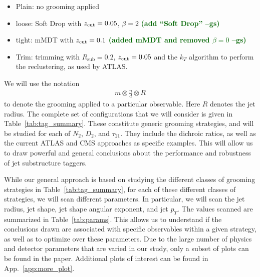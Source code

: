 \documentclass[11pt,letterpaper]{article}
\DeclareRobustCommand{\App}[1]{App.~\ref{#1}}
\DeclareRobustCommand{\Tab}[1]{Table~\ref{#1}}
\newcommand{\zcut}{z_{\rm cut}}
\newcommand{\gs}[1]{\textbf{\textcolor{darkgreen}{(#1 --gs)}}}
\begin{document}
\begin{itemize}
\item Plain: no grooming applied
\item loose: Soft Drop with $\zcut=0.05$, $\beta=2$ \gs{add ``Soft Drop''}
\item tight: mMDT with $\zcut=0.1$ \gs{added mMDT and removed $\beta=0$}
\item Trim: trimming with $R_{\text{sub}}=0.2$,  $ \zcut=0.05$ and the $k_T$ algorithm to perform the reclustering, as used by ATLAS.
\end{itemize}
We will use the notation 
\begin{align}
m \otimes \frac{n}{d} \otimes R
\end{align}
to denote the grooming applied to a particular observable. Here $R$ denotes the jet radius. The complete set of configurations that we will consider is given in \Tab{tab:tag_summary}. These constitute generic grooming strategies, and will be studied for each of $N_2$, $D_2$, and $\tau_{21}$. They include the dichroic ratios, as well as the current ATLAS and CMS approaches as specific examples.  This will allow us to draw powerful and general conclusions about the performance and robustness of jet substructure taggers.






While our general approach is based on studying the different classes of grooming strategies in \Tab{tab:tag_summary}, for each of these different classes of strategies, we will scan different parameters. In particular, we will scan the jet radius, jet shape, jet shape angular exponent, and jet $p_T$. The values scanned are summarized in \Tab{tab:params}. This allows us to understand if the conclusions drawn are associated with specific observables within a given strategy, as well as to optimize over these parameters. Due to the large number of physics and detector parameters that are varied in our study, only a subset of plots can be found in the paper. Additional plots of interest can be found in \App{app:more_plot}.
\end{document}
